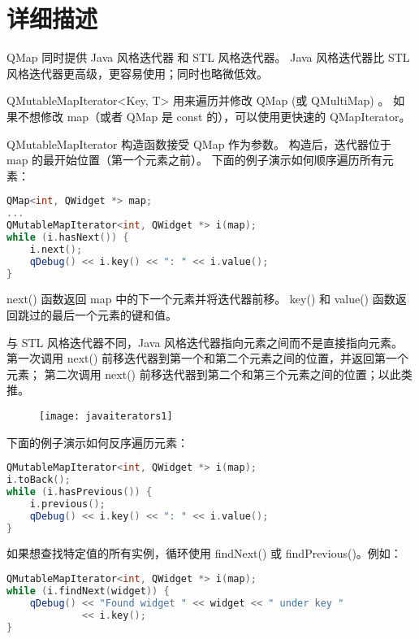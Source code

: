 \section{详细描述}

QMap 同时提供 Java 风格迭代器 和 STL 风格迭代器。
Java 风格迭代器比 STL 风格迭代器更高级，更容易使用；同时也略微低效。

QMutableMapIterator<Key, T> 用来遍历并修改 QMap (或 QMultiMap) 。
如果不想修改 map（或者 QMap 是 const 的），可以使用更快速的 QMapIterator。

QMutableMapIterator 构造函数接受 QMap 作为参数。
构造后，迭代器位于 map 的最开始位置（第一个元素之前）。
下面的例子演示如何顺序遍历所有元素：

\begin{lstlisting}[language=C++]
QMap<int, QWidget *> map;
...
QMutableMapIterator<int, QWidget *> i(map);
while (i.hasNext()) {
    i.next();
    qDebug() << i.key() << ": " << i.value();
}
\end{lstlisting}

next() 函数返回 map 中的下一个元素并将迭代器前移。
key() 和 value() 函数返回跳过的最后一个元素的键和值。

与 STL 风格迭代器不同，Java 风格迭代器指向元素之间而不是直接指向元素。
第一次调用 next() 前移迭代器到第一个和第二个元素之间的位置，并返回第一个元素；
第二次调用 next() 前移迭代器到第二个和第三个元素之间的位置；以此类推。


\begin{figure}[hbt!]  
	\centering
    \texttt{[image: javaiterators1]}
\end{figure}


下面的例子演示如何反序遍历元素：

\begin{lstlisting}[language=C++]
QMutableMapIterator<int, QWidget *> i(map);
i.toBack();
while (i.hasPrevious()) {
    i.previous();
    qDebug() << i.key() << ": " << i.value();
}
\end{lstlisting}

如果想查找特定值的所有实例，循环使用 findNext() 或 findPrevious()。例如：

\begin{lstlisting}[language=C++]
QMutableMapIterator<int, QWidget *> i(map);
while (i.findNext(widget)) {
    qDebug() << "Found widget " << widget << " under key "
             << i.key();
}
\end{lstlisting}

